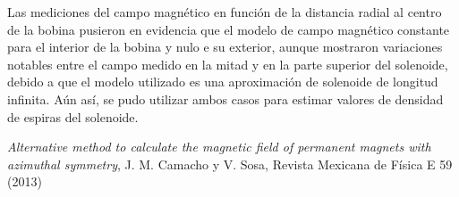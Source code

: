 \documentclass[12pt]{article}
\begin{document}
Las mediciones del campo magnético en función de la distancia radial al centro de la bobina pusieron en evidencia que el modelo de campo magnético constante para el interior de la bobina y nulo e su exterior, aunque mostraron variaciones notables entre el campo medido en la mitad y en la parte superior del solenoide, debido a que el modelo utilizado es una aproximación de solenoide de longitud infinita. Aún así, se pudo utilizar ambos casos para estimar valores de densidad de espiras del solenoide.\\

\begin{thebibliography}{9}

\emph{Alternative method to calculate the magnetic field of permanent magnets with azimuthal symmetry}, J. M. Camacho y V. Sosa, Revista Mexicana de Física E 59 (2013)


\end{thebibliography}
\end{document}
